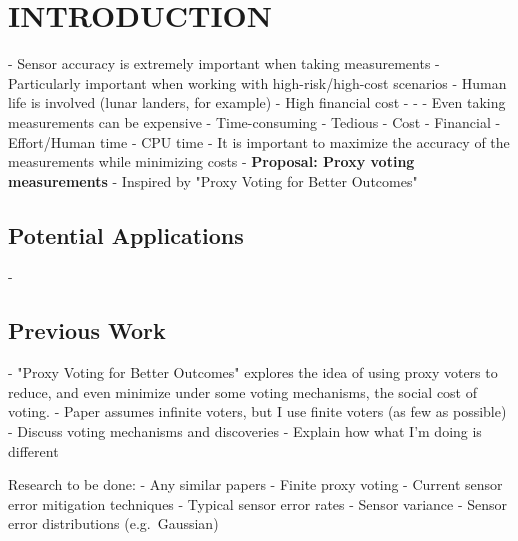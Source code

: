 %
%

\chapter{INTRODUCTION}\label{ch:introduction}
\thispagestyle{empty}

- Sensor accuracy is extremely important when taking measurements
- Particularly important when working with high-risk/high-cost scenarios
    - Human life is involved (lunar landers, for example)
    - High financial cost
    - %
    - %
- Even taking measurements can be expensive
    - Time-consuming
    - Tedious
    - Cost
        - Financial
        - Effort/Human time
        - CPU time
- It is important to maximize the accuracy of the measurements while minimizing
  costs
    - \textbf{Proposal: Proxy voting measurements}
        - Inspired by "Proxy Voting for Better Outcomes"\cite{Cohensius2017}

\section{Potential Applications}\label{sec:potential-applications}
- %

\section{Previous Work}\label{sec:previous-work}
- "Proxy Voting for Better Outcomes"\cite{Cohensius2017} explores the idea of
  using proxy voters to reduce, and even minimize under some voting mechanisms,
  the social cost of voting.
    - Paper assumes infinite voters, but I use finite voters (as few as possible)
    - Discuss voting mechanisms and discoveries
    - Explain how what I'm doing is different

Research to be done:
- Any similar papers
- Finite proxy voting
- Current sensor error mitigation techniques
- Typical sensor error rates
- Sensor variance
- Sensor error distributions (e.g.\ Gaussian)

